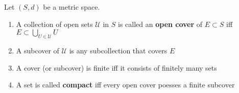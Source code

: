 \documentclass[../notes.tex]{subfiles}
\begin{document}
\begin{definition}
    Let $(S,d)$ be a metric space.
    \begin{enumerate}
        \item A collection of open sets $\mathcal{U}$ in $S$ is called an \textbf{open cover} of $E \subset S$ iff $E \subset \bigcup_{U \in \mathcal{U}} U$
        \item A subcover of $\mathcal{U}$ is any subcollection that covers $E$
        \item A cover (or subcover) is finite iff it consists of finitely many sets
        \item A set is called \textbf{compact} iff every open cover poesses a finite subcover
    \end{enumerate}
\end{definition}
\end{document}
